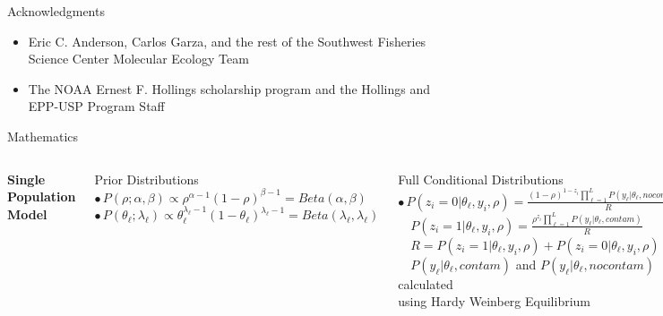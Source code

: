 \documentclass[letter,graphicx]{beamer}
\begin{document}
\begin{frame}{Acknowledgments}
\begin{itemize}
\item Eric C. Anderson, Carlos Garza, and the rest of the Southwest Fisheries Science Center Molecular Ecology Team
\vspace{4mm}
\item The NOAA Ernest F. Hollings scholarship program and the Hollings and EPP-USP Program Staff
\end{itemize}
\end{frame}

\begin{frame}{Mathematics}
\begin{tiny}
\begin{columns}[T]

\column{2.25in}
\centerline{\textbf{Single Population Model}}
\vspace{2mm}
Prior Distributions \\ \vspace{1mm}
$\bullet \, P(\rho;\alpha,\beta) \propto \rho^{\alpha - 1}(1 - \rho)^{\beta - 1} = Beta(\alpha, \beta)$ \\ \vspace{1mm}
$\bullet \, P(\theta_{\ell};\lambda_{\ell}) \propto \theta_{\ell}^{\lambda_{\ell}-1}(1 - \theta_{\ell})^{\lambda_{\ell}-1} = Beta(\lambda_{\ell},\lambda_{\ell})$ \\ 
\vspace{2mm}

Full Conditional Distributions \\ \vspace{1mm}
$\bullet \, P(z_i=0|\theta_{\ell},y_i,\rho) = \frac{(1-\rho)^{1-z_i}\prod_{\ell=1}^{L} P(y_{\ell}|\theta_{\ell},nocontam)}{R}$ \\ \vspace{1mm}
$\quad P(z_i=1|\theta_{\ell},y_i,\rho) = \frac{\rho^{z_i}\prod_{\ell=1}^{L} P(y_{\ell}|\theta_{\ell},contam)}{R}$ \\ \vspace{1mm}
$\quad R = P(z_i=1|\theta_{\ell},y_i,\rho) + P(z_i = 0|\theta_{\ell},y_i,\rho)$ \\ \vspace{1mm}
$\quad P(y_{\ell}|\theta_{\ell},contam)$ and $P(y_{\ell}|\theta_{\ell},nocontam)$ calculated  \\  \vspace{1mm}
\quad using Hardy Weinberg Equilibrium \\  \vspace{1mm}


\end{columns}
\end{tiny}
\end{frame}
\end{document}
